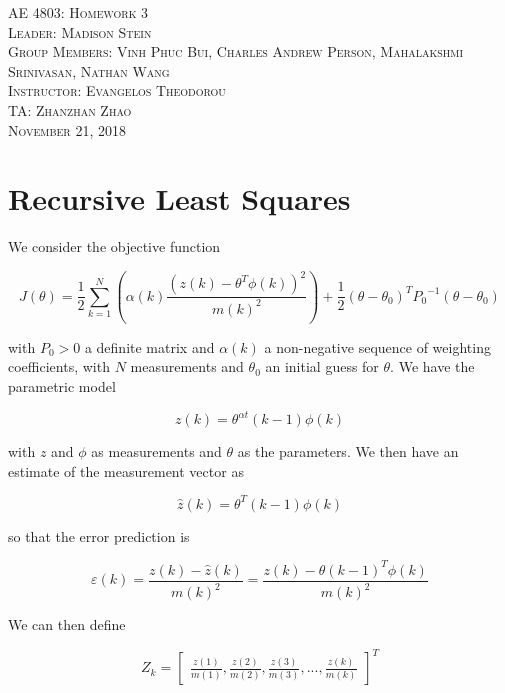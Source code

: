 \documentclass{article}
\begin{document}
\begin{titlepage}
    \center
    \textsc{\LARGE AE 4803: Homework 3}\\[1.5cm]
    \textsc{\Large Leader: Madison Stein}\\[0.5cm]
    \textsc{\Large Group Members: Vinh Phuc Bui, Charles Andrew Person, Mahalakshmi Srinivasan, Nathan Wang}\\[2cm]
    \textsc{\large Instructor: Evangelos Theodorou}\\[0.5cm]
    \textsc{\large TA: Zhanzhan Zhao}\\[1cm]
    \textsc{\large November 21, 2018}
\end{titlepage}

\section{Recursive Least Squares}

We consider the objective function

\begin{equation}
J(\theta) = 
\frac{1}{2} \sum\limits_{k=1}^N (\alpha(k) \frac{(z(k) - \theta^T \phi(k))^2}{m(k)^2}) + \frac{1}{2} (\theta - \theta_0)^T {P_0}^{-1} (\theta - \theta_0)
\end{equation}

with $P_0 > 0$ a definite matrix and $\alpha(k)$ a non-negative sequence of weighting coefficients, with $N$ measurements and $\theta_0$ an initial guess for $\theta$. We have the parametric model

\begin{equation}
z(k) = \theta^{\alpha t} (k-1) \phi (k)
\end{equation}

with $z$ and $\phi$ as measurements and $\theta$ as the parameters. We then have an estimate of the measurement vector as

\begin{equation}
\hat{z} (k) = \theta^T (k-1) \phi (k)
\end{equation}

so that the error prediction is

\begin{equation}
\varepsilon (k) = \frac{z(k) - \hat{z}(k)}{m(k)^2} = \frac{z(k) - \theta (k-1)^T \phi(k)}{m(k)^2}
\end{equation}

We can then define

\[
Z_k =
\begin{bmatrix}
\frac{z(1)}{m(1)},\frac{z(2)}{m(2)},\frac{z(3)}{m(3)},...,\frac{z(k)}{m(k)}
\end{bmatrix}^T
\]
\end{document}

